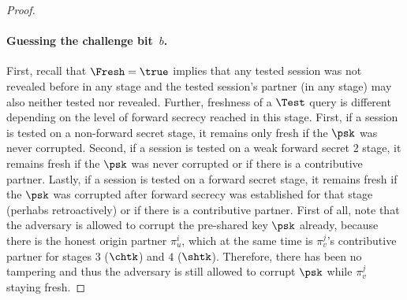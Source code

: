 \begin{proof}
	\paragraph{Guessing the challenge bit~$b$.}
	First, recall that $\Fresh = \true$ implies that any tested session was not revealed before in any stage and the tested session's partner (in any stage) may also neither tested nor revealed.
	Further, freshness of a $\Test$ query is different depending on the level of forward secrecy reached in this stage.
	First, if a session is tested on a non-forward secret stage, it remains only fresh if the $\psk$ was never corrupted.
	Second, if a session is tested on a weak forward secret 2 stage, it remains fresh if the $\psk$ was never corrupted or if there is a contributive partner.
	Lastly, if a session is tested on a forward secret stage, it remains fresh if the $\psk$ was corrupted after forward secrecy was established for that stage (perhabs retroactively) or if there is a contributive partner.
	First of all, note that the adversary is allowed to corrupt the pre-shared key $\psk$ already, because there is the honest origin partner $\pi_u^i$, which at the same time is $\pi_v^j$'s contributive partner for stages $3$ ($\chtk$) and $4$ ($\shtk$).
	Therefore, there has been no tampering and thus the adversary is still allowed to corrupt $\psk$ while $\pi_v^j$ staying fresh.
\end{proof}




